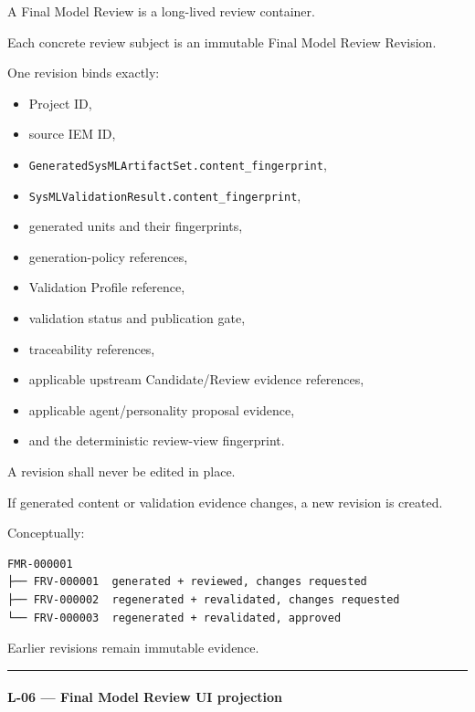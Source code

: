 A Final Model Review is a long-lived review container.

Each concrete review subject is an immutable Final Model Review Revision.

One revision binds exactly:

\begin{itemize}
\tightlist
\item
  Project ID,
\item
  source IEM ID,
\item
  \texttt{GeneratedSysMLArtifactSet.content\_fingerprint},
\item
  \texttt{SysMLValidationResult.content\_fingerprint},
\item
  generated units and their fingerprints,
\item
  generation-policy references,
\item
  Validation Profile reference,
\item
  validation status and publication gate,
\item
  traceability references,
\item
  applicable upstream Candidate/Review evidence references,
\item
  applicable agent/personality proposal evidence,
\item
  and the deterministic review-view fingerprint.
\end{itemize}

A revision shall never be edited in place.

If generated content or validation evidence changes, a new revision is created.

Conceptually:

\begin{verbatim}
FMR-000001
├── FRV-000001  generated + reviewed, changes requested
├── FRV-000002  regenerated + revalidated, changes requested
└── FRV-000003  regenerated + revalidated, approved
\end{verbatim}

Earlier revisions remain immutable evidence.

\begin{center}\rule{0.5\linewidth}{0.5pt}\end{center}

\hypertarget{l-06--final-model-review-ui-projection}{%
\paragraph{L-06 --- Final Model Review UI projection}\label{l-06--final-model-review-ui-projection}}

